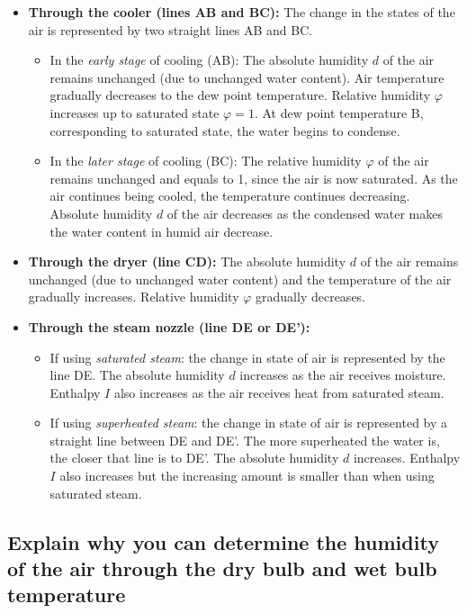 \begin{itemize}
    \item \textbf{Through the cooler (lines AB and BC):} The change in the states of the air is represented by two straight lines AB and BC.
    \begin{itemize}
        \item In the \textit{early stage} of cooling (AB): The absolute humidity $d$ of the air remains unchanged (due to unchanged water content). Air temperature gradually decreases to the dew point temperature. Relative humidity $\varphi$ increases up to saturated state $\varphi = 1$. At dew point temperature B, corresponding to saturated state, the water begins to condense.
        \item In the \textit{later stage} of cooling (BC): The relative humidity $\varphi$ of the air remains unchanged and equals to 1, since the air is now saturated. As the air continues being cooled, the temperature continues decreasing. Absolute humidity $d$ of the air decreases as the condensed water makes the water content in humid air decrease.
    \end{itemize}

    \item \textbf{Through the dryer (line CD):} The absolute humidity $d$ of the air remains unchanged (due to unchanged water content) and the temperature of the air gradually increases. Relative humidity $\varphi$ gradually decreases.

    \item \textbf{Through the steam nozzle (line DE or DE'):}
    \begin{itemize}
        \item If using \textit{saturated steam}: the change in state of air is represented by the line DE. The absolute humidity $d$ increases as the air receives moisture. Enthalpy $I$ also increases as the air receives heat from saturated steam.
        \item If using \textit{superheated steam}: the change in state of air is represented by a straight line between DE and DE'. The more superheated the water is, the closer that line is to DE'. The absolute humidity $d$ increases. Enthalpy $I$ also increases but the increasing amount is smaller than when using saturated steam.
    \end{itemize}
\end{itemize}

\subsection{Explain why you can determine the humidity of the air through the dry bulb and wet bulb temperature}


